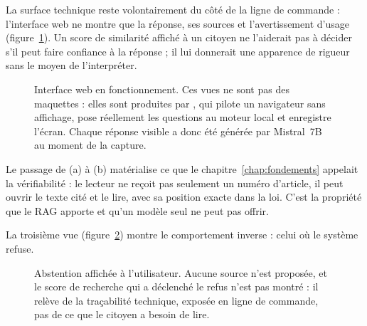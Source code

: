 La surface technique reste volontairement du côté de la ligne de commande : l'interface web ne
montre que la réponse, ses sources et l'avertissement d'usage
(figure~\ref{fig:interface}). Un score de similarité affiché à un citoyen ne l'aiderait pas à
décider s'il peut faire confiance à la réponse ; il lui donnerait une apparence de rigueur sans le
moyen de l'interpréter.



\begin{figure}[htbp]
  \centering

  \vspace{10pt}


  \caption[Interface web : réponse citée et source dépliée]{Interface web en fonctionnement. Ces
  vues ne sont pas des maquettes : elles sont produites par , qui
  pilote un navigateur sans affichage, pose réellement les questions au moteur local et
  enregistre l'écran. Chaque réponse visible a donc été générée par Mistral~7B au moment de la
  capture.}
  \label{fig:interface}
\end{figure}

Le passage de (a) à (b) matérialise ce que le chapitre~\ref{chap:fondements} appelait la
vérifiabilité : le lecteur ne reçoit pas seulement un numéro d'article, il peut ouvrir le texte
cité et le lire, avec sa position exacte dans la loi. C'est la propriété que le RAG apporte et
qu'un modèle seul ne peut pas offrir.

La troisième vue (figure~\ref{fig:interface-abstention}) montre le comportement inverse : celui
où le système refuse.

\begin{figure}[htbp]
  \centering
  \caption[Interface web : abstention]{Abstention affichée à l'utilisateur. Aucune source n'est
  proposée, et le score de recherche qui a déclenché le refus n'est pas montré : il relève de la
  traçabilité technique, exposée en ligne de commande, pas de ce que le citoyen a besoin de lire.}
  \label{fig:interface-abstention}
\end{figure}

